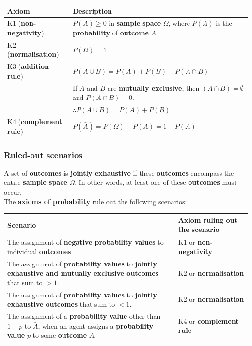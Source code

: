 \documentclass[11pt]{article}
\begin{document}
\begin{center}
\begin{tabularx}{\textwidth}{|X|X|}
\hline
Axiom & Description\\
\hline
K1 (\textbf{non-negativity}) & \(P(A) \ge 0\) in \textbf{sample space} \(\Omega\), where \(P(A)\) is the \textbf{probability} of \textbf{outcome} \(A\).\\
\hline
K2 (\textbf{normalisation}) & \(P(\Omega) = 1\)\\
\hline
K3 (\textbf{addition rule}) & \(P (A \cup B) = P(A) + P(B) - P(A \cap B)\)\\
 & If \(A\) and \(B\) are \textbf{mutually exclusive}, then \((A \cap B) = \emptyset\) and \(P(A \cap B) = 0\).\\
 & \(\therefore P(A \cup B) = P(A) + P(B)\)\\
\hline
K4 (\textbf{complement rule}) & \(P(\bar{A}) = P(\Omega) - P(A) = 1 - P(A)\)\\
\hline
\end{tabularx}
\end{center}
\subsubsection{Ruled-out scenarios}
\label{sec:orgf832eae}
A set of \textbf{outcomes} is \textbf{jointly exhaustive} if these \textbf{outcomes} encompass the entire \textbf{sample space} \(\Omega\). In other words, at least one of these \textbf{outcomes} must occur.  \\

The \textbf{axioms of probability} rule out the following scenarios:
\begin{center}
\begin{tabularx}{\textwidth}{|X|X|}
\hline
Scenario & Axiom ruling out the scenario\\
\hline
The assignment of \textbf{negative probability values} to individual \textbf{outcomes} & K1 or \textbf{non-negativity}\\
\hline
The assignment of \textbf{probability values} to \textbf{jointly exhaustive and mutually exclusive outcomes} that sum to \(> 1\). & K2 or \textbf{normalisation}\\
\hline
The assignment of \textbf{probability values} to \textbf{jointly exhaustive outcomes} that sum to \(< 1\). & K2 or \textbf{normalisation}\\
\hline
The assignment of a \textbf{probability value} other than \(1 - p\) to \(\bar{A}\), when an agent assigns a \textbf{probability value} \(p\) to some \textbf{outcome} \(A\). & K4 or \textbf{complement rule}\\
\hline
\end{tabularx}
\end{center}
\end{document}
